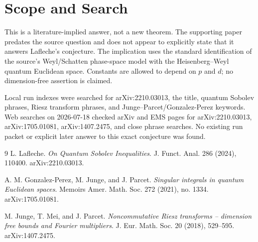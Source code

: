 \documentclass[11pt]{article}
\begin{document}
\section*{Scope and Search}

This is a literature-implied answer, not a new theorem.  The supporting paper
predates the source question and does not appear to explicitly state that it
answers Lafleche's conjecture.  The implication uses the standard
identification of the source's Weyl/Schatten phase-space model with the
Heisenberg--Weyl quantum Euclidean space.  Constants are allowed to depend on
\(p\) and \(d\); no dimension-free assertion is claimed.

Local run indexes were searched for arXiv:2210.03013, the title, quantum
Sobolev phrases, Riesz transform phrases, and Junge--Parcet/Gonzalez-Perez
keywords.  Web searches on 2026-07-18 checked arXiv and EMS pages for
arXiv:2210.03013, arXiv:1705.01081, arXiv:1407.2475, and close phrase
searches.  No existing run packet or explicit later answer to this exact
conjecture was found.

\begin{thebibliography}{9}
L. Lafleche.
\emph{On Quantum Sobolev Inequalities}.
J. Funct. Anal. 286 (2024), 110400. arXiv:2210.03013.

A. M. Gonzalez-Perez, M. Junge, and J. Parcet.
\emph{Singular integrals in quantum Euclidean spaces}.
Memoirs Amer. Math. Soc. 272 (2021), no. 1334. arXiv:1705.01081.

M. Junge, T. Mei, and J. Parcet.
\emph{Noncommutative Riesz transforms -- dimension free bounds and Fourier multipliers}.
J. Eur. Math. Soc. 20 (2018), 529--595. arXiv:1407.2475.
\end{thebibliography}
\end{document}
